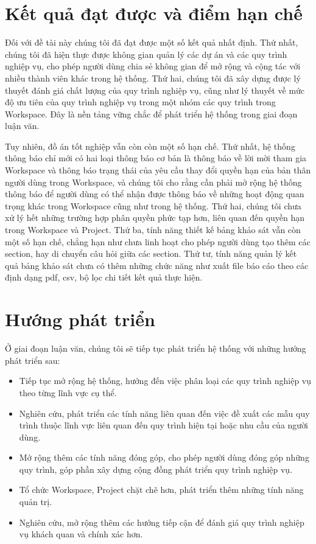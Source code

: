 \section{Kết quả đạt được và điểm hạn chế}
Đối với đề tài này chúng tôi đã đạt được một số kết quả nhất định.
Thứ nhất, chúng tôi đã hiện thực được không gian quản lý các dự án và các quy trình nghiệp vụ, cho phép người dùng chia sẻ không gian 
để mở rộng và cộng tác với nhiều thành viên khác trong hệ thống. Thứ hai, chúng tôi đã xây dựng được lý thuyết đánh giá chất lượng của quy
trình nghiệp vụ, cũng như lý thuyết về mức độ ưu tiên của quy trình nghiệp vụ trong một nhóm các quy trình trong Workspace. Đây là nền tảng
vững chắc để phát triển hệ thống trong giai đoạn luận văn.
\par
Tuy nhiên, đồ án tốt nghiệp vẫn còn còn một số hạn chế. Thứ nhất, hệ thống thông báo chỉ mới có hai loại thông báo cơ bản 
là thông báo về lời mời tham gia Workspace và thông báo trạng thái của yêu cầu thay đổi quyền hạn của bản thân người dùng 
trong Workspace, và chúng tôi cho rằng cần phải mở rộng hệ thống thông báo để người dùng có thể nhận được thông báo về những 
hoạt động quan trọng khác trong Workspace cũng như trong hệ thống. Thứ hai, chúng tôi chưa xử lý hết những trường hợp 
phân quyền phức tạp hơn, liên quan đến quyền hạn trong Workspace và Project. Thứ ba, tính năng thiết kế bảng khảo sát 
vẫn còn một số hạn chế, chẳng hạn như chưa linh hoạt cho phép người dùng tạo thêm các section, hay di chuyển câu hỏi 
giữa các section. Thứ tư, tính năng quản lý kết quả bảng khảo sát chưa có thêm những chức năng như xuất file báo cáo 
theo các định dạng pdf, csv, bộ lọc chi tiết kết quả thực hiện.

\section{Hướng phát triển}
Ở giai đoạn luận văn, chúng tôi sẽ tiếp tục phát triển hệ thống với những hướng phát triển sau:
\begin{itemize}
    \item Tiếp tục mở rộng hệ thống, hướng đến việc phân loại các quy trình nghiệp vụ theo từng lĩnh vực cụ thể.
    \item Nghiên cứu, phát triển các tính năng liên quan đến việc đề xuất các mẫu quy trình thuộc lĩnh vực liên quan đến quy trình hiện tại hoặc nhu cầu của người dùng.
    \item Mở rộng thêm các tính năng đóng góp, cho phép người dùng đóng góp những quy trình, góp phần xây dựng cộng đồng phát triển quy trình nghiệp vụ.
    \item Tổ chức Workspace, Project chặt chẽ hơn, phát triển thêm những tính năng quản trị.
    \item Nghiên cứu, mở rộng thêm các hướng tiếp cận để đánh giá quy trình nghiệp vụ khách quan và chính xác hơn.
\end{itemize}

